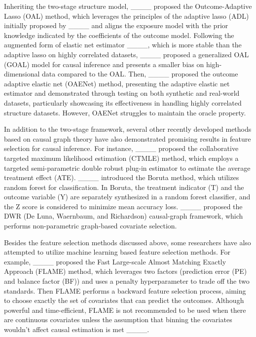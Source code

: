 Inheriting the two-stage structure model, ____ proposed the Outcome-Adaptive Lasso (OAL) method, which leverages the principles of the adaptive lasso (ADL) initially proposed by ____ and aligns the exposure model with the prior knowledge indicated by the coefficients of the outcome model. Following the augmented form of elastic net estimator ____, which is more stable than the adaptive lasso on highly correlated datasets, ____ proposed a generalized OAL (GOAL) model for causal inference and presents a smaller bias on high-dimensional data compared to the OAL. Then, ____ proposed the outcome adaptive elastic net (OAENet) method, presenting the adaptive elastic net estimator and demonstrated through testing on both synthetic and real-world datasets, particularly showcasing its effectiveness in handling highly correlated structure datasets. However, OAENet struggles to maintain the oracle property.

In addition to the two-stage framework, several other recently developed methods based on causal graph theory have also demonstrated promising results in feature selection for causal inference. For instance, ____ proposed the collaborative targeted maximum likelihood estimation (CTMLE) method, which employs a targeted semi-parametric double robust plug-in estimator to estimate the average treatment effect (ATE). ____ introduced the Boruta method, which utilizes random forest for classification. In Boruta, the treatment indicator (T) and the outcome variable (Y) are separately synthesized in a random forest classifier, and the Z score is considered to minimize mean accuracy loss. ____ proposed the DWR (De Luna, Waernbaum, and Richardson) causal-graph framework, which performs non-parametric graph-based covariate selection.

Besides the feature selection methods discussed above, some researchers have also attempted to utilize machine learning based feature selection methods. For example, ____ proposed the Fast Large-scale Almost Matching Exactly Approach (FLAME) method, which leverages two factors (prediction error (PE) and balance factor (BF)) and uses a penalty hyperparameter to trade off the two standards. Then FLAME performs a backward feature selection process, aiming to choose exactly the set of covariates that can predict the outcomes. Although powerful and time-efficient, FLAME is not recommended to be used when there are continuous covariates unless the assumption that binning the covariates wouldn't affect causal estimation is met ____.

